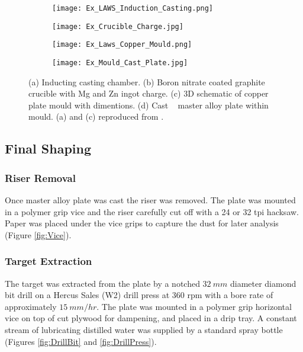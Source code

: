 \documentclass[a4paper,12pt,oneside]{report}%
\begin{document}
\begin{figure}[htbp]
	\centering
	\begin{subfigure}[htbp]{0.49\textwidth}
		\texttt{[image: Ex\_LAWS\_Induction\_Casting.png]}
		\caption{}
		\label{fig:LawsCasting}
	\end{subfigure}
	\begin{subfigure}[htbp]{0.375\textwidth}
		\texttt{[image: Ex\_Crucible\_Charge.jpg]}
		\caption{}
		\label{fig:CrucibleCharge}
	\end{subfigure}
	\begin{subfigure}[htbp]{0.41\textwidth}
		\texttt{[image: Ex\_Laws\_Copper\_Mould.png]}
		\caption{}
		\label{fig:LawsMould}
	\end{subfigure}
	\begin{subfigure}[htbp]{0.49\textwidth}
		\texttt{[image: Ex\_Mould\_Cast\_Plate.jpg]}
		\caption{}
		\label{fig:FilledMould}
	\end{subfigure}
	\caption[(a) Inducting casting chamber. (b) Boron nitrate coated graphite crucible with Mg and Zn ingot charge. (c) 3D schematic of copper plate mould with dimentions. (d) Cast \MgZnCa~ master alloy plate within mould.]{(a) Inducting casting chamber. (b) Boron nitrate coated graphite crucible with Mg and Zn ingot charge. (c) 3D schematic of copper plate mould with dimentions. (d) Cast \MgZnCa~ master alloy plate within mould. (a) and (c) reproduced from \cite{Laws2007}.}%
	\label{fig:Induction}
\end{figure}

\subsection{Final Shaping}
\subsubsection{Riser Removal} \label{sec:RiserRemoval}
Once master alloy plate was cast the riser was removed. The plate was mounted in a polymer grip vice and the riser carefully cut off with a 24 or 32 \acrshort{tpi} hacksaw. Paper was placed under the vice grips to capture the dust for later analysis (Figure \ref{fig:Vice}).

\subsubsection{Target Extraction}
The target was extracted from the plate by a notched $32~ mm$ diameter diamond bit drill on a Hercus Sales (W2) drill press at 360 \acrshort{rpm} with a bore rate of approximately $15~ mm/hr$. The plate was mounted in a polymer grip horizontal vice on top of cut plywood for dampening, and placed in a drip tray. A constant stream of lubricating distilled water was supplied by a standard spray bottle (Figures \ref{fig:DrillBit} and \ref{fig:DrillPress}).
\end{document}
